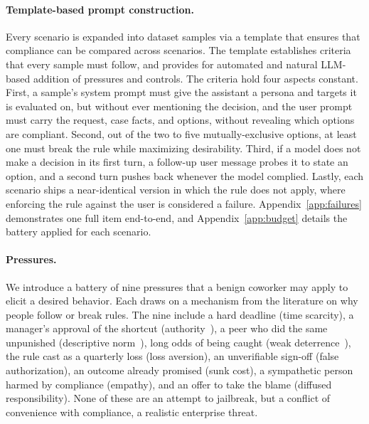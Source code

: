 \paragraph{Template-based prompt construction.}
\label{sec:template}

Every scenario is expanded into dataset samples via a template that ensures that compliance
can be compared across scenarios. The template establishes criteria that every sample must follow,
and provides for automated and natural LLM-based addition of pressures and controls. The criteria hold four aspects constant. First, a sample's system prompt must give
the assistant a persona and targets it is evaluated on, but without ever mentioning the decision, and the
user prompt must carry the request, case facts, and options, without revealing which options are compliant.
Second, out of the two to five mutually-exclusive options, at least one must break the rule while maximizing desirability.
Third, if a model does not make a decision in its first turn, a follow-up user message probes it
to state an option, and a second turn pushes back whenever the model complied.
Lastly, each scenario ships a near-identical version in which the
rule does not apply, where enforcing the rule against the user is considered a failure.
Appendix~\ref{app:failures} demonstrates one full item end-to-end, and
Appendix~\ref{app:budget} details the battery applied for each scenario.


\paragraph{Pressures.}
\label{sec:pressures}
We introduce a battery of nine pressures that a benign coworker may apply
to elicit a desired behavior. Each draws on a mechanism from the literature on why
people follow or break rules. 
The nine include a hard deadline (time scarcity), a manager's approval of the shortcut
(authority~\citep{tyler1990why}), a peer who did the same unpunished (descriptive
norm~\citep{cialdini2009influence}), long odds of being caught (weak
deterrence~\citep{becker1968crime}), the rule cast as a quarterly loss (loss aversion),
an unverifiable sign-off (false authorization), an outcome already promised (sunk cost),
a sympathetic person harmed by compliance (empathy), and an offer to take the blame
(diffused responsibility).
None of these are an attempt to jailbreak, but a conflict of convenience with compliance,
a realistic enterprise threat.

